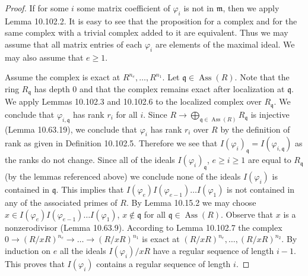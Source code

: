 \begin{proof}
If for some $i$ some matrix coefficient of $\varphi_i$ is not in $\mathfrak m$, then we apply Lemma 10.102.2. It is easy to see that the proposition for a complex and for the same complex with a trivial complex added to it are equivalent. Thus we may assume that all matrix entries of each $\varphi_i$ are elements of the maximal ideal. We may also assume that $e\geq1$.

Assume the complex is exact at $R^{n_e},\ldots,R^{n_1}$. Let $\mathfrak q\in\operatorname{Ass}(R)$. Note that the ring $R_{\mathfrak q}$ has depth $0$ and that the complex remains exact after localization at $\mathfrak q$. We apply Lemmas 10.102.3 and 10.102.6 to the localized complex over $R_{\mathfrak q}$. We conclude that $\varphi_{i,\mathfrak q}$ has rank $r_i$ for all $i$. Since $R\to\bigoplus_{\mathfrak q\in\operatorname{Ass}(R)}R_{\mathfrak q}$ is injective (Lemma 10.63.19), we conclude that $\varphi_i$ has rank $r_i$ over $R$ by the definition of rank as given in Definition 10.102.5. Therefore we see that $I(\varphi_i)_{\mathfrak q}=I(\varphi_{i,\mathfrak q})$ as the ranks do not change. Since all of the ideals $I(\varphi_i)_{\mathfrak q}$, $e\geq i\geq1$ are equal to $R_{\mathfrak q}$ (by the lemmas referenced above) we conclude none of the ideals $I(\varphi_i)$ is contained in $\mathfrak q$. This implies that $I(\varphi_e)I(\varphi_{e-1})\ldots I(\varphi_1)$ is not contained in any of the associated primes of $R$. By Lemma 10.15.2 we may choose $x\in I(\varphi_e)I(\varphi_{e-1})\ldots I(\varphi_1)$, $x\notin\mathfrak q$ for all $\mathfrak q\in\operatorname{Ass}(R)$. Observe that $x$ is a nonzerodivisor (Lemma 10.63.9). According to Lemma 10.102.7 the complex $0\to(R/xR)^{n_e}\to\ldots\to(R/xR)^{n_1}$ is exact at $(R/xR)^{n_e},\ldots,(R/xR)^{n_2}$. By induction on $e$ all the ideals $I(\varphi_i)/xR$ have a regular sequence of length $i-1$. This proves that $I(\varphi_i)$ contains a regular sequence of length $i$.


\end{proof}
